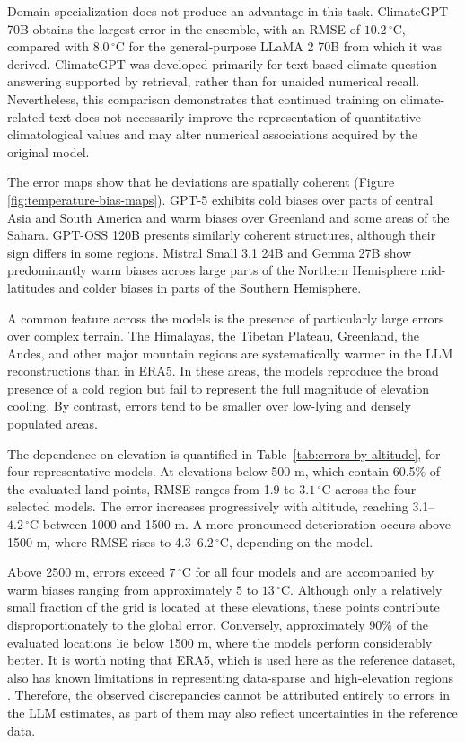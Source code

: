 Domain specialization does not produce an advantage in this task. ClimateGPT 70B obtains the largest error in the ensemble, with an RMSE of \(10.2\,^{\circ}\mathrm{C}\), compared with \(8.0\,^{\circ}\mathrm{C}\) for the general-purpose LLaMA 2 70B from which it was derived. ClimateGPT was developed primarily for text-based climate question answering supported by retrieval, rather than for unaided numerical recall. Nevertheless, this comparison demonstrates that continued training on climate-related text does not necessarily improve the representation of quantitative climatological values and may alter numerical associations acquired by the original model.

The error maps show that he deviations are spatially coherent (Figure \ref{fig:temperature-bias-maps}). GPT-5 exhibits cold biases over parts of central Asia and South America and warm biases over Greenland and some areas of the Sahara. GPT-OSS 120B presents similarly coherent structures, although their sign differs in some regions. Mistral Small 3.1 24B and Gemma 27B show predominantly warm biases across large parts of the Northern Hemisphere mid-latitudes and colder biases in parts of the Southern Hemisphere.

A common feature across the models is the presence of particularly large errors over complex terrain. The Himalayas, the Tibetan Plateau, Greenland, the Andes, and other major mountain regions are systematically warmer in the LLM reconstructions than in ERA5. In these areas, the models reproduce the broad presence of a cold region but fail to represent the full magnitude of elevation cooling. By contrast, errors tend to be smaller over low-lying and densely populated areas.

The dependence on elevation is quantified in Table~\ref{tab:errors-by-altitude}, for four representative models. At elevations below 500 m, which contain 60.5\% of the evaluated land points, RMSE ranges from 1.9 to \(3.1\,^{\circ}\mathrm{C}\) across the four selected models. The error increases progressively with altitude, reaching 3.1--\(4.2\,^{\circ}\mathrm{C}\) between 1000 and 1500 m. A more pronounced deterioration occurs above 1500 m, where RMSE rises to 4.3--\(6.2\,^{\circ}\mathrm{C}\), depending on the model.

Above 2500 m, errors exceed \(7\,^{\circ}\mathrm{C}\) for all four models and are accompanied by warm biases ranging from approximately \(5\) to \(13\,^{\circ}\mathrm{C}\). Although only a relatively small fraction of the grid is located at these elevations, these points contribute disproportionately to the global error. Conversely, approximately 90\% of the evaluated locations lie below 1500 m, where the models perform considerably better. It is worth noting that ERA5, which is used here as the reference dataset, also has known limitations in representing data-sparse and high-elevation regions \citep{delhasse_brief_2020,munoz-sabater_era5-land_2021}. Therefore, the observed discrepancies cannot be attributed entirely to errors in the LLM estimates, as part of them may also reflect uncertainties in the reference data.

